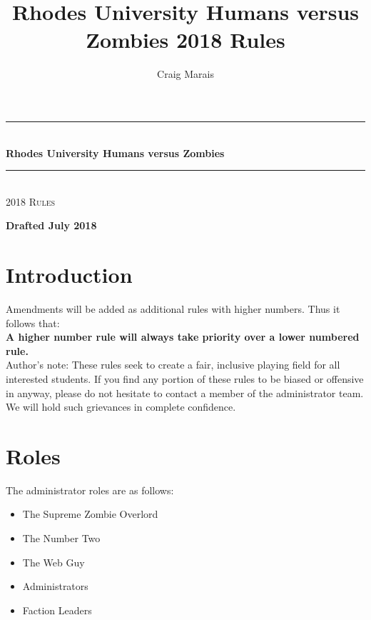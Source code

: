 \documentclass[a4paper,12pt]{article}
\title{Rhodes University Humans versus Zombies 2018 Rules}
\author{Craig Marais}
\begin{document}


\begin{titlepage}
\pagestyle{empty}
\begin{center}




\rule{\linewidth}{0.5mm}
\\[5mm]

{\Large \bfseries Rhodes University Humans versus Zombies}
\rule{\linewidth}{0.5mm}
\\[5mm]

\textsc{\Large 2018 Rules}
\\[5mm]

\vfill

\textbf{Drafted July 2018}

\end{center}
\end{titlepage}

\newpage
\tableofcontents

\newpage
\section{Introduction}
Amendments will be added as additional rules with higher numbers. Thus it follows that:
\\
{\bf A higher number rule will always take priority over a lower numbered rule.}\\
Author's note: These rules seek to create a fair, inclusive playing field for all interested students. If you find any portion of these rules to be biased or offensive in anyway, please do not hesitate to contact a member of the administrator team. We will hold such grievances in complete confidence.

\section{Roles}

The administrator roles are as follows:
\begin{itemize}
    \item {The Supreme Zombie Overlord}
    \item {The Number Two}
    \item {The Web Guy}
    \item {Administrators}
    \item {Faction Leaders}
\end{itemize}
\end{document}
